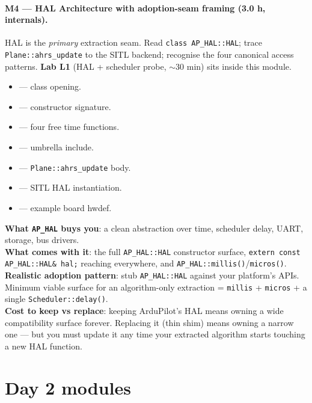 \documentclass[a4paper,11pt,twoside]{article}
\renewcommand{\adoptionsidebar}[1]{\begin{tcolorbox}[colback=cyan!4!white,colframe=cyan!50!black,title=Adoption side-bar,breakable]#1\end{tcolorbox}}
\begin{document}
\paragraph{M4 --- HAL Architecture with adoption-seam framing (3.0 h, internals).}
HAL is the \emph{primary} extraction seam. Read \texttt{class AP\_HAL::HAL}; trace \texttt{Plane::ahrs\_update} to the SITL backend; recognise the four canonical access patterns. \textbf{Lab L1} (HAL + scheduler probe, $\sim$30 min) sits inside this module.
\begin{itemize}
  \item {} --- class opening.
  \item {} --- constructor signature.
  \item {} --- four free time functions.
  \item {} --- umbrella include.
  \item {} --- \texttt{Plane::ahrs\_update} body.
  \item {} --- SITL HAL instantiation.
  \item {} --- example board hwdef.
\end{itemize}

\adoptionsidebar{
\textbf{What \texttt{AP\_HAL} buys you}: a clean abstraction over time, scheduler delay, UART, storage, bus drivers.\\
\textbf{What comes with it}: the full \texttt{AP\_HAL::HAL} constructor surface, \texttt{extern const AP\_HAL::HAL\& hal;} reaching everywhere, and \texttt{AP\_HAL::millis()}/\texttt{micros()}.\\
\textbf{Realistic adoption pattern}: stub \texttt{AP\_HAL::HAL} against your platform's APIs. Minimum viable surface for an algorithm-only extraction = \texttt{millis} + \texttt{micros} + a single \texttt{Scheduler::delay()}.\\
\textbf{Cost to keep vs replace}: keeping ArduPilot's HAL means owning a wide compatibility surface forever. Replacing it (thin shim) means owning a narrow one --- but you must update it any time your extracted algorithm starts touching a new HAL function.}

\section*{Day 2 modules}
\end{document}
